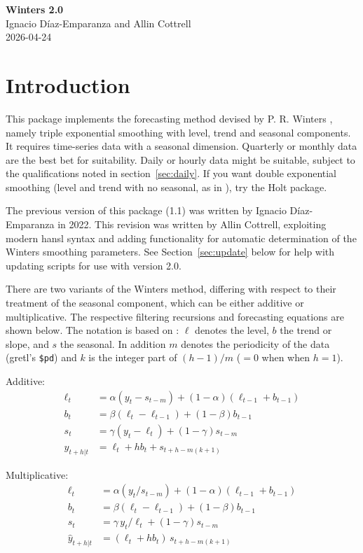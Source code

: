 \documentclass{article}
\begin{document}
\begin{center}
  {\Large \textbf{Winters 2.0}} \\[6pt]
  Ignacio Díaz-Emparanza and Allin Cottrell \\[6pt]
  2026-04-24
\end{center}

\section{Introduction}
\label{sec:intro}

This package implements the forecasting method devised by P. R. Winters
\citeyearpar{winters60}, namely triple exponential smoothing with level,
trend and seasonal components.  It requires time-series data with a
seasonal dimension. Quarterly or monthly data are the best bet for
suitability. Daily or hourly data might be suitable, subject to the
qualifications noted in section~\ref{sec:daily}. If you want double
exponential smoothing (level and trend with no seasonal, as in
\citealt{holt57}), try the \textsf{Holt} package.

The previous version of this package (1.1) was written by Ignacio
Díaz-Emparanza in 2022. This revision was written by Allin Cottrell,
exploiting modern hansl syntax and adding functionality for automatic
determination of the Winters smoothing parameters. See
Section~\ref{sec:update} below for help with updating scripts for use
with version 2.0.

There are two variants of the Winters method, differing with respect
to their treatment of the seasonal component, which can be either
additive or multiplicative. The respective filtering recursions and
forecasting equations are shown below. The notation is based on
\cite{hyndman2021}: $\ell$ denotes the level, $b$ the trend or slope,
and $s$ the seasonal.  In addition $m$ denotes the periodicity of the
data (gretl's \verb|$pd|) and $k$ is the integer part of
$(h-1)/m$ ($=0$ when when $h=1$).

Additive:
\begin{align*}
  \ell_t &= \alpha (y_t - s_{t-m}) + (1-\alpha) (\ell_{t-1} + b_{t-1})\\
  b_t &= \beta (\ell_t - \ell_{t-1}) + (1-\beta) b_{t-1}\\
  s_t &= \gamma (y_t - \ell_t) + (1-\gamma) s_{t-m}\\
  \hat{y}_{t+h|t} &= \ell_t + hb_t + s_{t+h-m(k+1)}
\end{align*}

Multiplicative:
\begin{align*}
  \ell_t &= \alpha (y_t / s_{t-m}) + (1-\alpha) (\ell_{t-1} + b_{t-1})\\
  b_t &= \beta (\ell_t - \ell_{t-1}) + (1-\beta) b_{t-1}\\
  s_t &= \gamma\, y_t / \ell_t + (1-\gamma) s_{t-m}\\
  \hat{y}_{t+h|t} &= (\ell_t + hb_t)\, s_{t+h-m(k+1)}
\end{align*}
\end{document}
